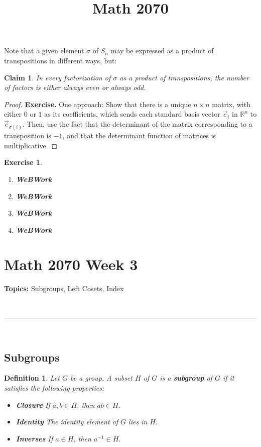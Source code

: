 \documentclass[a4paper,12pt]{report}
\newcounter{statement}
\numberwithin{statement}{chapter}
\newtheorem{defn}[statement]{Definition}
\newtheorem{claim}[statement]{Claim}
\newtheorem{ex}[statement]{\bf Exercise}
\numberwithin{equation}{chapter}
\numberwithin{section}{chapter}
\numberwithin{subsection}{section}
\begin{document}
Note that a given element $\sigma$ of $S_n$
may be expressed as a product of transpositions in different ways,
but:
\begin{claim}
In every factorization of $\sigma$ as a product of transpositions,
the number of factors is either always even or always odd.
\end{claim}



\begin{proof}

 {\bf Exercise.} 
One approach: Show that there is a unique $n \times n$ matrix, with either $0$ or $1$ as its coefficients,
which sends each standard basis vector $\vec{e}_i$ in $\mathbb{R}^n$ to $\vec{e}_{\sigma(i)}$.
Then, use the fact that the determinant of the matrix corresponding to a transposition is $-1$,
and that the determinant function of matrices is multiplicative.
\end{proof}

\begin{ex}
\begin{enumerate}
\item  
{\bf WeBWork}

\item  
{\bf WeBWork}

\item  
{\bf WeBWork}

\item  
{\bf WeBWork}
\end{enumerate}\end{ex}\title{Math 2070}
\setcounter{chapter}{3}\setcounter{section}{0}
\setcounter{subsection}{0}


\chapter*{Math 2070 Week 3}
{\bf Topics: }Subgroups, Left Cosets, Index




\quad\\\hrule
\quad\\
\section*{Subgroups}

\begin{defn}
Let $G$ be a group.
A subset $H$ of $G$ is a  {\bf subgroup}  of $G$ if it satisfies the following properties:




\begin{itemize}
\item 
 {\bf Closure}  If $a, b \in H$, then $ab \in H$.

\item 
 {\bf Identity}  The identity element of $G$ lies in $H$.

\item 
 {\bf Inverses}  If $a \in H$, then $a^{-1} \in H$.
\end{itemize}

\end{defn}
\end{document}
